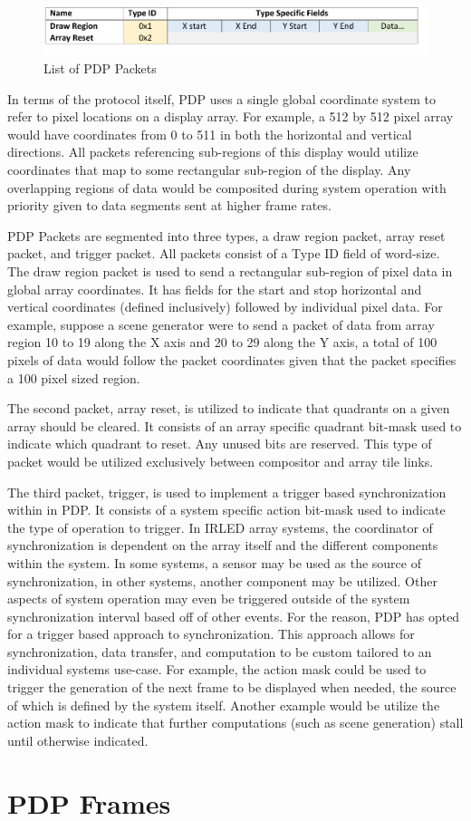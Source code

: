     \begin{figure}
        \centering
        \includegraphics[width=1.0\textwidth]{fig/packet_chart.pdf}
        \caption{List of PDP Packets}
        \label{fig:packets}
    \end{figure}

    In terms of the protocol itself, PDP uses a single global coordinate system to refer to pixel locations on a display array. For example, a 512 by 512 pixel array would have coordinates from 0 to 511 in both the horizontal and vertical directions. All packets referencing sub-regions of this display would utilize coordinates that map to some rectangular sub-region of the display. Any overlapping regions of data would be composited during system operation with priority given to data segments sent at higher frame rates.

    PDP Packets are segmented into three types, a draw region packet, array reset packet, and trigger packet. All packets consist of a Type ID field of word-size. The draw region packet is used to send a rectangular sub-region of pixel data in global array coordinates. It has fields for the start and stop horizontal and vertical coordinates (defined inclusively) followed by individual pixel data. For example, suppose a scene generator were to send a packet of data from array region 10 to 19 along the X axis and 20 to 29 along the Y axis, a total of 100 pixels of data would follow the packet coordinates given that the packet specifies a 100 pixel sized region.

    The second packet, array reset, is utilized to indicate that quadrants on a given array should be cleared. It consists of an array specific quadrant bit-mask used to indicate which quadrant to reset. Any unused bits are reserved. This type of packet would be utilized exclusively between compositor and array tile links.

    The third packet, trigger, is used to implement a trigger based synchronization within in PDP. It consists of a system specific action bit-mask used to indicate the type of operation to trigger. In IRLED array systems, the coordinator of synchronization is dependent on the array itself and the different components within the system. In some systems, a sensor may be used as the source of synchronization, in other systems, another component may be utilized. Other aspects of system operation may even be triggered outside of the system synchronization interval based off of other events. For the reason, PDP has opted for a trigger based approach to synchronization. This approach allows for synchronization, data transfer, and computation to be custom tailored to an individual systems use-case. For example, the action mask could be used to trigger the generation of the next frame to be displayed when needed, the source of which is defined by the system itself. Another example would be utilize the action mask to indicate that further computations (such as scene generation) stall until otherwise indicated.

\section{PDP Frames}

